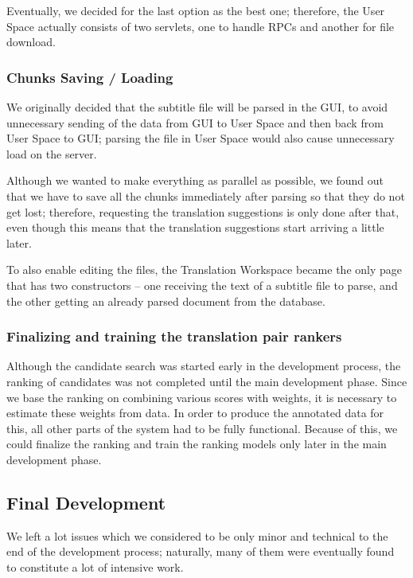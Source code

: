 {Eventually, we decided for the last option as the best one; therefore, the User Space actually consists of two servlets, one to handle RPCs and another for file download.

\subsubsection{Chunks Saving / Loading}

We originally decided that the subtitle file will be parsed in the GUI, 
to avoid unnecessary sending of the data from GUI to User Space and then back from User Space to GUI; parsing the file in User Space would also cause unnecessary load on the server.

Although we wanted to make everything as parallel as possible, we found out that we have to save all the chunks immediately after parsing so that they do not get lost; therefore, requesting the translation suggestions is only done after that, even though this means that the translation suggestions start arriving a little later.

To also enable editing the files, the Translation Workspace became the only page that has two constructors -- one receiving the text of a subtitle file to parse, and the other getting an already parsed document from the database.

\subsubsection{Finalizing and training the translation pair rankers}

Although the candidate search was started early in the development process, the ranking of candidates was not completed until the main development phase. Since we base the ranking on combining various scores with weights, it is necessary to estimate these weights from data. In order to produce the annotated data for this, all other parts of the system had to be fully functional. Because of this, we could finalize the ranking and train the ranking models only later in the main development phase.



\subsection{Final Development}
\label{subsec:final_development}

We left
a lot issues which we considered to be only minor and technical
to the end of the development process;
naturally, many of them were eventually found to constitute a lot of intensive work.

}
